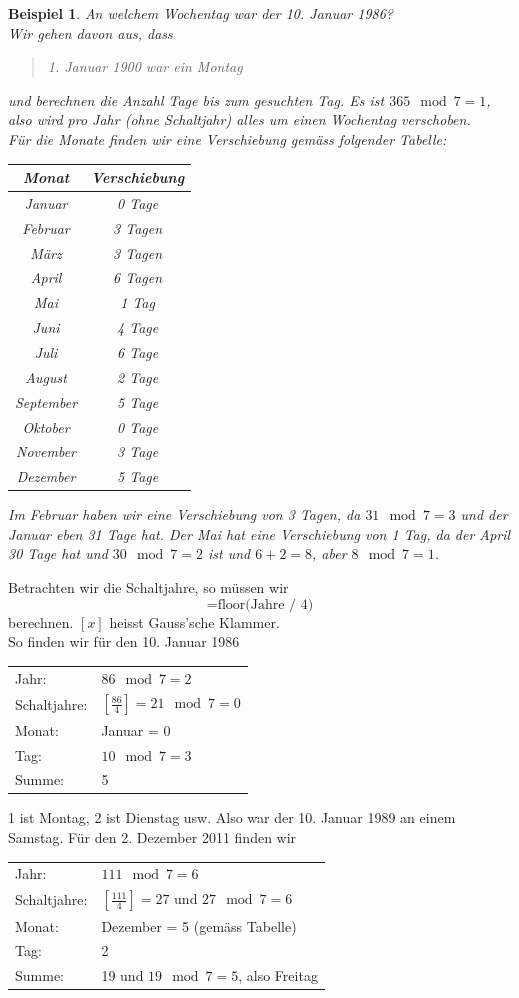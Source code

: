 \documentclass{report}
\newtheorem{myexample}{Beispiel}
\begin{document}
\begin{myexample}An welchem Wochentag war der 10. Januar 1986?\\
Wir gehen davon aus, dass
\begin{quote}1. Januar 1900 war ein Montag\end{quote}
und berechnen die Anzahl Tage bis zum gesuchten Tag. Es ist $365 \mod{7} = 1$, also wird pro Jahr (ohne Schaltjahr) alles um einen Wochentag verschoben.\\
Für die Monate finden wir eine Verschiebung gemäss folgender Tabelle:
\begin{center}\begin{tabular}{c | c}Monat & Verschiebung \\
\hline
Januar & 0 Tage \\
Februar & 3 Tagen \\
März & 3 Tagen \\
April & 6 Tagen \\
Mai & 1 Tag \\
Juni & 4 Tage \\
Juli & 6 Tage \\
August & 2 Tage \\
September & 5 Tage \\
Oktober & 0 Tage \\
November & 3 Tage \\
Dezember & 5 Tage
\end{tabular}\end{center}
Im Februar haben wir eine Verschiebung von 3 Tagen, da $31 \mod{7} = 3$ und der Januar eben 31 Tage hat. Der Mai hat eine Verschiebung von 1 Tag, da der April 30 Tage hat und $30 \mod{7} = 2$ ist und $6 + 2 = 8$, aber $8 \mod{7} = 1$.\end{myexample}
Betrachten wir die Schaltjahre, so müssen wir
\begin{equation}[\frac{Jahre}{4}] = \mbox{floor(Jahre / 4)}\end{equation}
berechnen. $[x]$ heisst Gauss'sche Klammer.\\
So finden wir für den 10. Januar 1986
\begin{center}\begin{tabular}{l l}
Jahr: & $86 \mod{7} = 2$ \\
Schaltjahre: & $[\frac{86}{4}] = 21 \mod{7} = 0$ \\
Monat: & Januar = 0 \\
Tag: & $10 \mod{7} = 3$ \\
Summe: & 5\end{tabular}\end{center}
1 ist Montag, 2 ist Dienstag usw. Also war der 10. Januar 1989 an einem Samstag. Für den 2. Dezember 2011 finden wir
\begin{center}\begin{tabular}{l l}
Jahr: & $111 \mod{7} = 6$ \\
Schaltjahre: & $[\frac{111}{4}] = 27$ und $27 \mod{7} = 6$ \\
Monat: & Dezember = 5 (gemäss Tabelle) \\
Tag: & 2 \\
Summe: & 19 und $19 \mod{7} = 5$, also Freitag\end{tabular}\end{center}
\end{document}
